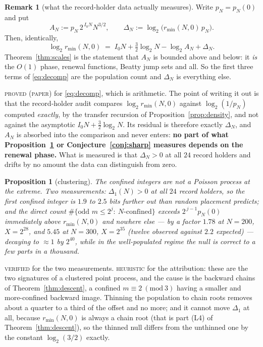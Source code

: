 \documentclass[11pt,reqno]{amsart}
\theoremstyle{plain}
\newtheorem{proposition}[theorem]{Proposition}
\theoremstyle{definition}
\newtheorem{remark}[theorem]{Remark}
\newcommand{\lab}[1]{\textnormal{\textsc{\small #1}}}
\begin{document}
\begin{remark}[what the record-holder data actually measures]\label{rem:decomp}
Write $p_N=p_N(0)$ and put
\[
A_N:=p_N\,2^{\,I_0N}N^{3/2},\qquad
\Delta_N:=\log_2\!\bigl(r_{\min}(N,0)\,p_N\bigr).
\]
Then, identically,
\begin{equation}\label{eq:decomp}
\log_2 r_{\min}(N,0)\;=\;I_0N+\tfrac32\log_2 N-\log_2 A_N+\Delta_N .
\end{equation}
Theorem~\ref{thm:scales} is the statement that $A_N$ is bounded above and below:
it \emph{is} the $O(1)$ phase, renewal functions, Beatty jump sets and all. So the
first three terms of \eqref{eq:decomp} are the population count and $\Delta_N$ is
everything else.
\end{remark}
\lab{proved (paper)} for \eqref{eq:decomp}, which is arithmetic. The point of
writing it out is that the record-holder audit compares $\log_2 r_{\min}(N,0)$
against $\log_2(1/p_N)$ computed \emph{exactly}, by the transfer recursion of
Proposition~\ref{prop:density}, and not against the asymptotic
$I_0N+\frac32\log_2N$. Its residual is therefore exactly $\Delta_N$, and $A_N$ is
absorbed into the comparison and never enters: \textbf{no part of what
Proposition~\ref{prop:clustering} or Conjecture~\ref{conj:sharp} measures depends
on the renewal phase.} What is measured is that $\Delta_N>0$ at all $24$ record
holders and drifts by no amount the data can distinguish from zero.

\begin{proposition}[clustering]\label{prop:clustering}
The confined integers are not a Poisson process at the extreme. Two measurements:
$\Delta_1(N)>0$ at all $24$ record holders, so the \emph{first} confined integer
is $1.9$ to $2.5$ bits further out than random placement predicts; and the direct
count $\#\{\text{odd }m\le 2^{j}:\ N\text{-confined}\}$ exceeds $2^{\,j-1}p_N(0)$
immediately above $r_{\min}(N,0)$ and nowhere else --- by a factor $1.78$ at
$N=200$, $X=2^{28}$, and $5.45$ at $N=300$, $X=2^{35}$ (twelve observed against
$2.2$ expected) --- decaying to $\approx1$ by $2^{40}$, while in the
well-populated regime the null is correct to a few parts in a thousand.
\end{proposition}
\lab{verified} for the two measurements. \lab{heuristic} for the attribution:
these are the two signatures of a clustered point process, and the cause is the
backward chains of Theorem~\ref{thm:descent}, a confined $m\equiv2\ (\mathrm{mod}\ 3)$
having a smaller and more-confined backward image. Thinning the population to
chain roots removes about a quarter to a third of the offset and no more; and it
cannot move $\Delta_1$ at all, because $r_{\min}(N,0)$ is always a chain root
(that is part (L4) of Theorem~\ref{thm:descent}), so the thinned null differs from
the unthinned one by the constant $\log_2(3/2)$ exactly.
\end{document}

